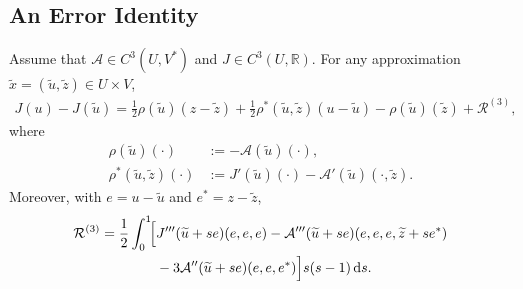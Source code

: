 \subsection{An Error Identity}
\label{subsec:nonlinear-dwr}

\begin{theorem}
\label{thm:becker-rannacher}
Assume that \(\mathcal{A}\in C^3(U,V^\ast)\) and \(J\in C^3(U,\mathbb{R})\). For any approximation \(\widetilde{x}=(\widetilde{u},\widetilde{z})\in U\times V\),
\begin{align}
  J(u)-J(\widetilde{u})
  =
  \frac{1}{2}\rho(\widetilde{u})(z-\widetilde{z})
  +
  \frac{1}{2}
  \rho^\ast(\widetilde{u},\widetilde{z})
  (u-\widetilde{u})
  -
  \rho(\widetilde{u})(\widetilde{z})
  +
  \mathcal{R}^{(3)},
  \label{eq:nonlinear-dwr-identity}
\end{align}
where 
\begin{align}
  \rho(\widetilde{u})(\cdot)
  &:=
  -\mathcal{A}(\widetilde{u})(\cdot),
  \label{eq:nonlinear-primal-residual}\\
  \rho^\ast(\widetilde{u},\widetilde{z})(\cdot)
  &:=
  J'(\widetilde{u})(\cdot)
  -
  \mathcal{A}'(\widetilde{u})
  (\cdot,\widetilde{z}).
  \label{eq:nonlinear-adjoint-residual}
\end{align}
Moreover, with \(e=u-\widetilde u\) and \(e^\ast=z-\widetilde z\),
\begin{equation}
 \begin{aligned}
 \mathcal R^{(3)}
 =\frac12\int_0^1\!\Bigl[{}
 &J'''(\widetilde u+se)(e,e,e) -\mathcal A'''(\widetilde u+se)
   (e,e,e,\widetilde z+se^\ast)\\
 &-3\mathcal A''(\widetilde u+se)(e,e,e^\ast)
 \Bigr]s(s-1)\,\mathrm ds .
 \end{aligned}
 \label{eq:nonlinear-dwr-remainder}
\end{equation}
\end{theorem}

